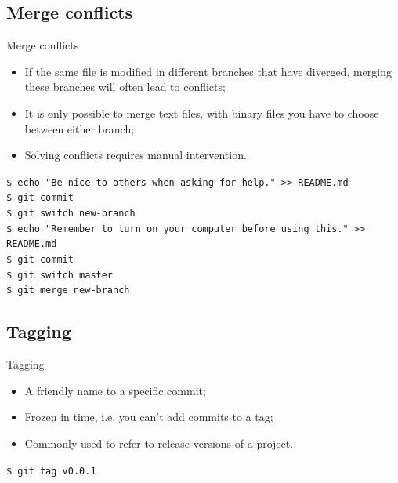 \documentclass{beamer}
\begin{document}
\subsection{Merge conflicts}
\begin{frame}{Merge conflicts}
  \begin{itemize}
    \item If the same file is modified in different branches that have diverged, merging these branches will often lead to conflicts;
    \item It is only possible to merge text files, with binary files you have to choose between either branch;
    \item Solving conflicts requires manual intervention.
  \end{itemize}
  \begin{block}{}
    \texttt{\$ echo "Be nice to others when asking for help." >> README.md} \\
    \texttt{\$ git commit} \\
    \texttt{\$ git switch new-branch} \\
    \texttt{\$ echo "Remember to turn on your computer before using this." >> README.md} \\
    \texttt{\$ git commit} \\
    \texttt{\$ git switch master} \\
    \texttt{\$ git merge new-branch}
  \end{block}
\end{frame}

\subsection{Tagging}
\begin{frame}{Tagging}
  \begin{itemize}
    \item A friendly name to a specific commit;
    \item Frozen in time, i.e. you can't add commits to a tag;
    \item Commonly used to refer to release versions of a project.
  \end{itemize}
  \begin{block}{}
    \texttt{\$ git tag v0.0.1}
  \end{block}
\end{frame}
\end{document}
